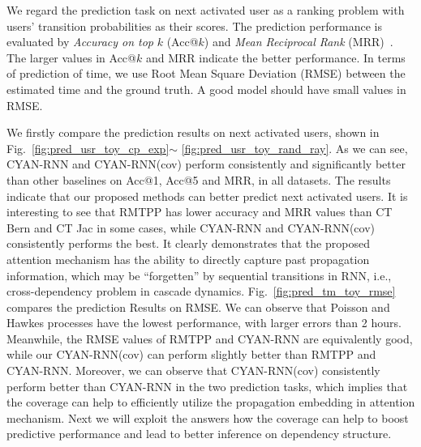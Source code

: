 %
We regard the prediction task on next activated user as a ranking problem
with users' transition probabilities as their scores. 
The prediction performance is
evaluated by \textit{Accuracy on top} $k$ (Acc@$k$) and \textit{Mean Reciprocal Rank}
(MRR)~\cite{voorhees1999trec}.
The larger values in Acc@$k$ and MRR indicate the better performance.
In terms of prediction of time, we use Root Mean Square Deviation
(RMSE) between the estimated time and the ground truth. 
A good model should have small values in RMSE.   

We firstly compare the prediction results on
next activated users, shown in Fig.~\ref{fig:pred_usr_toy_cp_exp}$\sim$
\ref{fig:pred_usr_toy_rand_ray}. As we can see, CYAN-RNN and CYAN-RNN(cov)
perform consistently and significantly better than other baselines on 
Acc@1, Acc@5 and MRR, in all datasets. 
The results indicate that our proposed methods can better predict next activated
users. It is interesting to see that RMTPP has lower accuracy and MRR values than CT Bern
and CT Jac in some cases, while 
CYAN-RNN and CYAN-RNN(cov) consistently performs the best. 
It clearly demonstrates
that the proposed attention mechanism has the ability to directly capture past
propagation information, which may be ``forgetten'' by sequential transitions in
RNN, i.e., cross-dependency problem in cascade dynamics.
Fig.~\ref{fig:pred_tm_toy_rmse} compares the prediction Results on RMSE.
We can observe that Poisson and Hawkes processes have the lowest performance,
with larger errors than 2 hours. Meanwhile, the
RMSE values of RMTPP and CYAN-RNN are equivalently good, while our 
CYAN-RNN(cov) can perform slightly better than RMTPP and CYAN-RNN. 
Moreover, we can observe that CYAN-RNN(cov) consistently perform better than CYAN-RNN in the two prediction tasks, which implies that the coverage can
help to efficiently utilize the propagation embedding in attention mechanism.
Next we will exploit the answers how the coverage can help to boost predictive
performance and lead to better inference on dependency structure.

